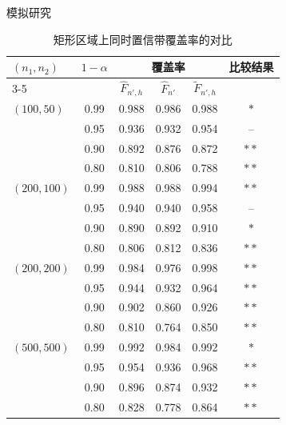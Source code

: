 \documentclass{beamer}
\begin{document}
\begin{frame}{模拟研究}
\vspace{-0.3cm}
\begin{table}[!htb]
\caption{ 矩形区域上同时置信带覆盖率的对比}
\begin{center}
\footnotesize 
\renewcommand{\arraystretch}{0.8} 
\begin{tabular}{lccccc}
\toprule
\multirow{2}{*}{$(n_1,n_2)$} & \multirow{2}{*}{$1-\alpha$} & \multicolumn{3}{c}{覆盖率} & \multirow{2}{*}{比较结果} \\ 
\cmidrule{3-5}
& & $\hat{F}_{n', h}$ & $\hat{F}_{n'}$ & $\tilde{F}_{n', h}$ & \\ 
\midrule
$(100,50)$  & 0.99 & 0.988 & 0.986 & 0.988 & $\ast$ \\
            & 0.95 & 0.936 & 0.932 & 0.954 & -- \\
            & 0.90 & 0.892 & 0.876 & 0.872 & $\ast\ast$ \\
            & 0.80 & 0.810 & 0.806 & 0.788 & $\ast\ast$ \\ \addlinespace
$(200,100)$ & 0.99 & 0.988 & 0.988 & 0.994 & $\ast\ast$ \\
            & 0.95 & 0.940 & 0.940 & 0.958 & -- \\
            & 0.90 & 0.890 & 0.892 & 0.910 & $\ast$ \\
            & 0.80 & 0.806 & 0.812 & 0.836 & $\ast\ast$ \\ \addlinespace
$(200,200)$ & 0.99 & 0.984 & 0.976 & 0.998 & $\ast\ast$ \\
            & 0.95 & 0.944 & 0.932 & 0.964 & $\ast\ast$ \\
            & 0.90 & 0.902 & 0.860 & 0.926 & $\ast\ast$ \\
            & 0.80 & 0.810 & 0.764 & 0.850 & $\ast\ast$ \\ \addlinespace
$(500,500)$ & 0.99 & 0.992 & 0.984 & 0.992 & $\ast$ \\
            & 0.95 & 0.954 & 0.936 & 0.968 & $\ast\ast$\\
            & 0.90 & 0.896 & 0.874 & 0.932 & $\ast\ast$ \\
            & 0.80 & 0.828 & 0.778 & 0.864 & $\ast\ast$\\ 
\bottomrule
\end{tabular}
\end{center}
\end{table}
\end{frame}
\end{document}
